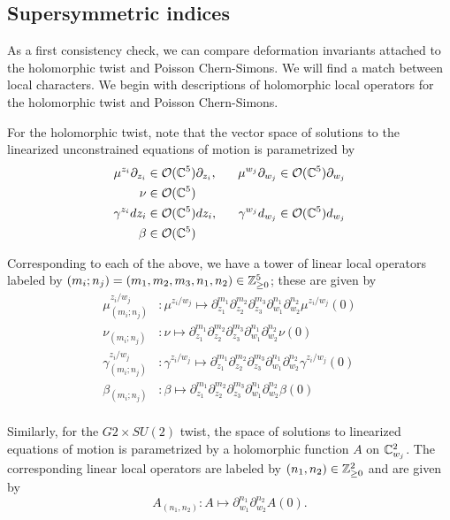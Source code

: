 \subsection{Supersymmetric indices}

As a first consistency check, we can compare deformation invariants attached to the holomorphic twist and Poisson Chern-Simons. We will find a match between local characters. We begin with descriptions of holomorphic local operators for the holomorphic twist and Poisson Chern-Simons.

For the holomorphic twist, note that the vector space of solutions to the linearized unconstrained equations of motion is parametrized by 
\begin{align*}
\mu^{z_i}\partial_{z_i} & \in \cO(\C^5)\partial_{z_i},\ \ \ \ \ \mu^{w_j}\partial_{w_j}\in\cO (\C^5)\partial_{w_j}  \\
\nu & \in \cO (\C^5) \\
\gamma^{z_i}dz_i & \in \cO (\C^5)dz_i, \ \ \ \ \ \gamma^{w_j}d_{w_j}\in\cO (\C^5)d_{w_j} \\
\beta & \in \cO (\C^5)
\end{align*}

Corresponding to each of the above, we have a tower of linear local operators labeled by $(m_i; n_j) = (m_1, m_2, m_3, n_1,  n_2)\in \mathbb{Z}^5_{\geq 0}$; these are given by
\begin{align*}
 \mu^{z_i/w_j}_{(m_i; n_j)} &: \mu^{z_i/w_j}\mapsto \partial_{z_1}^{m_1}\partial_{z_2}^{m_2}\partial_{z_3}^{m_3}\partial_{w_1}^{n_1}\partial_{w_2}^{n_2}\mu^{z_i/w_j} (0) \\
\nu_{(m_i; n_j)} &: \nu\mapsto \partial_{z_1}^{m_1}\partial_{z_2}^{m_2}\partial_{z_3}^{m_3}\partial_{w_1}^{n_1}\partial_{w_2}^{n_2}\nu (0) \\
\gamma^{z_i/w_j}_{(m_i; n_j)} &: \gamma^{z_i/w_j}\mapsto \partial_{z_1}^{m_1}\partial_{z_2}^{m_2}\partial_{z_3}^{m_3}\partial_{w_1}^{n_1}\partial_{w_2}^{n_2}\gamma^{z_i/w_j} (0) \\
 \beta_{(m_i; n_j)} &: \beta\mapsto \partial_{z_1}^{m_1}\partial_{z_2}^{m_2}\partial_{z_3}^{m_3}\partial_{w_1}^{n_1}\partial_{w_2}^{n_2}\beta (0) \\
\end{align*}

Similarly, for the $G2\times SU(2)$ twist, the space of solutions to linearized equations of motion is parametrized by a holomorphic function $A$ on $\mathbb{C}^2_{w_j}$. The corresponding linear local operators are labeled by $(n_1,n_2)\in \mathbb{Z}^2_{\geq 0}$  and are given by \[A_{(n_1,n_2)} : A \mapsto \partial_{w_1}^{n_1}\partial_{w_2}^{n_2} A (0).\]

